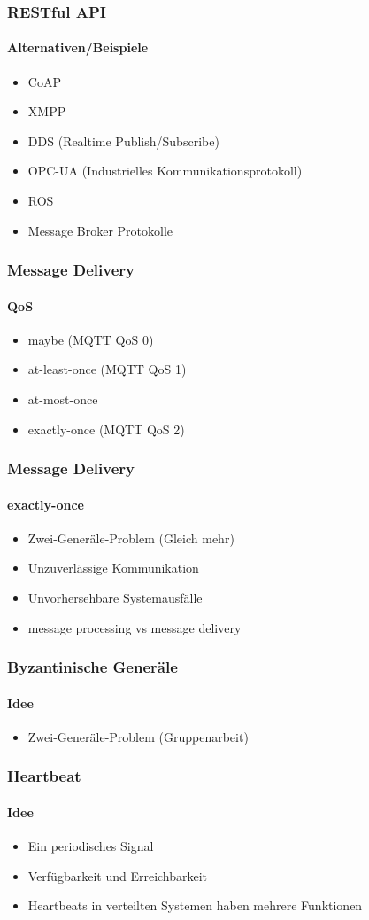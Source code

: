 \begin{frame}
  \frametitle{RESTful API}
  \framesubtitle{Alternativen/Beispiele}
  \begin{itemize}
    \item CoAP
    \item XMPP
    \item DDS (Realtime Publish/Subscribe)
    \item OPC-UA (Industrielles Kommunikationsprotokoll)
    \item ROS
    \item Message Broker Protokolle
  \end{itemize}
\end{frame}



\begin{frame}
  \frametitle{Message Delivery}
  \framesubtitle{QoS}
  \begin{itemize}
    \item maybe (MQTT QoS 0)
    \item at-least-once (MQTT QoS 1)
    \item at-most-once
    \item exactly-once (MQTT QoS 2)
  \end{itemize}
\end{frame}

\begin{frame}
  \frametitle{Message Delivery}
  \framesubtitle{exactly-once}
  \begin{itemize}
    \item Zwei-Generäle-Problem (Gleich mehr)
    \item Unzuverlässige Kommunikation
    \item Unvorhersehbare Systemausfälle
    \item message processing vs  message delivery
  \end{itemize}
\end{frame}

\begin{frame}
  \frametitle{Byzantinische Generäle }
  \framesubtitle{Idee}
  \begin{itemize}
    \item Zwei-Generäle-Problem (Gruppenarbeit)
  \end{itemize}
\end{frame}


\begin{frame}
  \frametitle{Heartbeat}
  \framesubtitle{Idee}
  \begin{itemize}
    \item Ein periodisches Signal
    \item Verfügbarkeit und Erreichbarkeit
    \item Heartbeats in verteilten Systemen haben mehrere Funktionen
  \end{itemize}
\end{frame}

